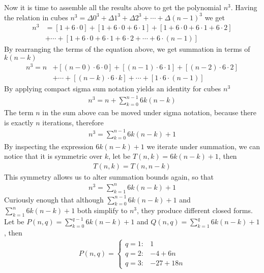Now it is time to assemble all the results above to get the polynomial $n^3$.
Having the relation in cubes $n^3 = \Delta 0^3 + \Delta 1^3 + \Delta 2^3 + \cdots + \Delta (n-1)^3$
we get
\begin{align}
    \label{eq:cubes-as-sum-of-first-order-differences}
    n^3 &= [1+6\cdot0]+[1+6\cdot0+6\cdot1]+[1+6\cdot0+6\cdot1+6\cdot2] \nonumber \\
    &+ \cdots + [1+6\cdot0+6\cdot1+6\cdot2+\cdots+6\cdot(n-1)]
\end{align}
By rearranging the terms of the equation above, we get summation in terms of $k (n-k)$
\begin{align}
    \label{eq:rearranged-cubes}
    n^3 = n &+ [(n-0) \cdot 6 \cdot 0] + [(n-1)\cdot6\cdot1] + [(n-2)\cdot6\cdot2] \nonumber \\
    &+ \cdots + [(n-k)\cdot 6 \cdot k] + \cdots + [1\cdot6\cdot(n-1)]
\end{align}
By applying compact sigma sum notation yields an identity for cubes $n^3$
\begin{align}
    \label{eq:apply-sigma-notation}
    n^3 = n + \sum_{k=0}^{n-1} 6k(n-k)
\end{align}
The term $n$ in the sum above can be moved under sigma notation, because there is exactly $n$ iterations, therefore
\begin{align}
    \label{eq:move-n-under-sigma}
    n^3 = \sum_{k=0}^{n-1} 6k(n-k) + 1
\end{align}
By inspecting the expression $6k(n-k) + 1$ we iterate under summation,
we can notice that it is symmetric over $k$, let be $T(n,k) = 6k(n-k) + 1$, then
\begin{align}
    \label{eq:symmetry}
    T(n,k) = T(n,n-k)
\end{align}
This symmetry allows us to alter summation bounds again, so that
\begin{align}
    \label{eq:alter-summation-bounds}
    n^3 = \sum_{k=1}^{n} 6k(n-k) + 1
\end{align}
Curiously enough that although $\sum_{k=0}^{n-1} 6k(n-k) + 1$ and $\sum_{k=1}^{n} 6k(n-k) + 1$ both simplify to $n^3$,
they produce different closed forms.
Let be $P(n, q) = \sum_{k=0}^{q-1} 6k(n-k) + 1$ and $Q(n, q) = \sum_{k=1}^{q} 6k(n-k) + 1$, then
\begin{align*}
    P(n, q) =
    \begin{cases}
        q = 1: & 1 \\
        q = 2: & -4 + 6 n \\
        q = 3: & -27 + 18 n
    \end{cases}
\end{align*}
